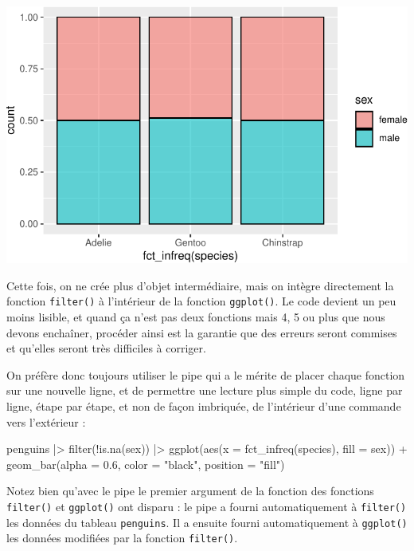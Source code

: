 \documentclass[
  a4paper,
  DIV=11,
  numbers=noendperiod,
  oneside]{scrreprt}
\newenvironment{Shaded}{}{}
\newcommand{\AttributeTok}[1]{\textcolor[rgb]{0.84,0.23,0.29}{#1}}
\newcommand{\FloatTok}[1]{\textcolor[rgb]{0.00,0.36,0.77}{#1}}
\newcommand{\FunctionTok}[1]{\textcolor[rgb]{0.44,0.26,0.76}{#1}}
\newcommand{\NormalTok}[1]{\textcolor[rgb]{0.14,0.16,0.18}{#1}}
\newcommand{\SpecialCharTok}[1]{\textcolor[rgb]{0.00,0.36,0.77}{#1}}
\newcommand{\StringTok}[1]{\textcolor[rgb]{0.01,0.18,0.38}{#1}}
\begin{document}
\includegraphics{04-DataWrangling_files/figure-pdf/unnamed-chunk-15-1.pdf}

Cette fois, on ne crée plus d'objet intermédiaire, mais on intègre
directement la fonction \texttt{filter()} à l'intérieur de la fonction
\texttt{ggplot()}. Le code devient un peu moins lisible, et quand ça
n'est pas deux fonctions mais 4, 5 ou plus que nous devons enchaîner,
procéder ainsi est la garantie que des erreurs seront commises et
qu'elles seront très difficiles à corriger.

On préfère donc toujours utiliser le pipe qui a le mérite de placer
chaque fonction sur une nouvelle ligne, et de permettre une lecture plus
simple du code, ligne par ligne, étape par étape, et non de façon
imbriquée, de l'intérieur d'une commande vers l'extérieur :

\begin{Shaded}
\begin{Highlighting}[]
\NormalTok{penguins }\SpecialCharTok{|\textgreater{}} 
  \FunctionTok{filter}\NormalTok{(}\SpecialCharTok{!}\FunctionTok{is.na}\NormalTok{(sex)) }\SpecialCharTok{|\textgreater{}} 
  \FunctionTok{ggplot}\NormalTok{(}\FunctionTok{aes}\NormalTok{(}\AttributeTok{x =} \FunctionTok{fct\_infreq}\NormalTok{(species), }\AttributeTok{fill =}\NormalTok{ sex)) }\SpecialCharTok{+}
  \FunctionTok{geom\_bar}\NormalTok{(}\AttributeTok{alpha =} \FloatTok{0.6}\NormalTok{, }\AttributeTok{color =} \StringTok{"black"}\NormalTok{, }\AttributeTok{position =} \StringTok{"fill"}\NormalTok{)}
\end{Highlighting}
\end{Shaded}

Notez bien qu'avec le pipe le premier argument de la fonction des
fonctions \texttt{filter()} et \texttt{ggplot()} ont disparu : le pipe a
fourni automatiquement à \texttt{filter()} les données du tableau
\texttt{penguins}. Il a ensuite fourni automatiquement à
\texttt{ggplot()} les données modifiées par la fonction
\texttt{filter()}.
\end{document}

